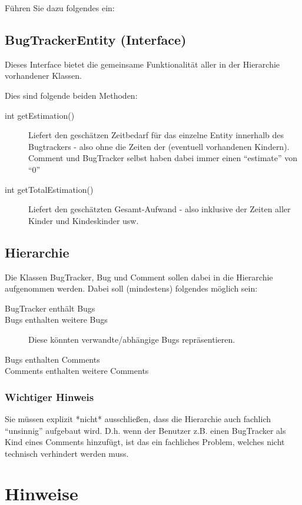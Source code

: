 \documentclass[oneside,a4paper]{scrartcl}
\begin{document}
Führen Sie dazu folgendes ein:

\subsection{BugTrackerEntity (Interface)}
Dieses Interface bietet die gemeinsame Funktionalität aller in der Hierarchie vorhandener Klassen.

Dies sind folgende beiden Methoden:

\begin{description}
	\item[int getEstimation()]
		Liefert den geschätzen Zeitbedarf für das einzelne Entity innerhalb des Bugtrackers - also ohne die Zeiten der (eventuell vorhandenen Kindern).
		Comment und BugTracker selbst haben dabei immer einen \enquote{estimate} von \enquote{0}
	\item[int getTotalEstimation()]		
		Liefert den geschätzten Gesamt-Aufwand - also inklusive der Zeiten aller Kinder und Kindeskinder usw.
\end{description}



\subsection{Hierarchie}
Die Klassen BugTracker, Bug und Comment sollen dabei in die Hierarchie aufgenommen werden.
Dabei soll (mindestens) folgendes möglich sein:

\begin{description}
	\item[BugTracker enthält Bugs]
	\item[Bugs enthalten weitere Bugs] Diese könnten verwandte/abhängige Bugs repräsentieren.
	\item[Bugs enthalten Comments]		
	\item[Comments enthalten weitere Comments]		
\end{description}


\subsubsection{Wichtiger Hinweis}
Sie müssen explizit *nicht* ausschließen, dass die Hierarchie auch fachlich \enquote{unsinnig} aufgebaut wird.
D.h. wenn der Benutzer z.B. einen BugTracker als Kind eines Comments hinzufügt, ist das ein fachliches Problem, welches nicht technisch verhindert werden muss.


\section*{Hinweise}
\end{document}
